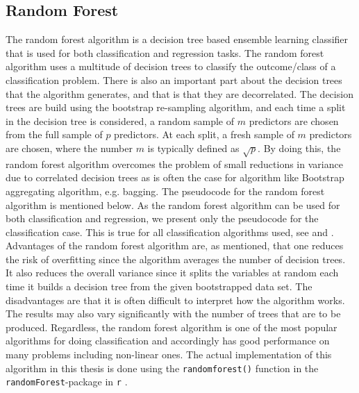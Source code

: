 \documentclass[../thesis.tex]{subfiles}
\begin{document}
\subsection{Random Forest}
\label{subsec:random_forr}

\noindent The random forest algorithm \citep{ho1995random} is a decision tree based ensemble learning classifier that is used for both classification and regression tasks. The random forest algorithm uses a multitude of decision trees to classify the outcome/class of a classification problem. There is also an important part about the decision trees that the algorithm generates, and that is that they are decorrelated. The decision trees are build using the bootstrap re-sampling algorithm, and each time a split in the decision tree is considered, a random sample of $m$ predictors are chosen from the full sample of $p$ predictors. At each split, a fresh sample of $m$ predictors are chosen, where the number $m$ is typically defined as $\sqrt{p}$. By doing this, the random forest algorithm overcomes the problem of small reductions in variance due to correlated decision trees as is often the case for algorithm like Bootstrap aggregating algorithm, e.g. bagging. The pseudocode for the random forest algorithm is mentioned below. As the random forest algorithm can be used for both classification and regression, we present only the pseudocode for the classification case. This is true for all classification algorithms used, see \citep{friedman2009elements} and \citep{james2013introduction}.\\
\indent Advantages of the random forest algorithm are, as mentioned, that one reduces the risk of overfitting since the algorithm averages the number of decision trees. It also reduces the overall variance since it splits the variables at random each time it builds a decision tree from the given bootstrapped data set. The disadvantages are that it is often difficult to interpret how the algorithm works. The results may also vary significantly with the number of trees that are to be produced. Regardless, the random forest algorithm is one of the most popular algorithms for doing classification and accordingly has good performance on many problems including non-linear ones. The actual implementation of this algorithm in this thesis is done using the \texttt{randomforest()} function in the \texttt{randomForest}-package in \texttt{r} \citep{randomforest}.\\
\end{document}
